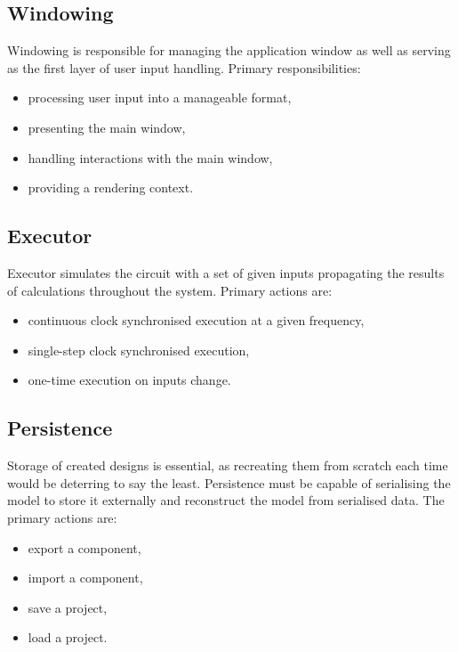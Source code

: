 \documentclass[12pt, a4paper]{article}
\newenvironment{itemlist}
{
  \vspace{-0.5\topsep}
  \begin{itemize}
    \setlength{\itemsep}{4pt}
    \setlength{\parskip}{0pt}
} {
  \end{itemize}
  \vspace{-0.5\topsep}
}
\begin{document}
\subsection{Windowing}
Windowing is responsible for managing the application window as well as serving
as the first layer of user input handling. Primary responsibilities:
\begin{itemlist}
  \item processing user input into a manageable format,
  \item presenting the main window,
  \item handling interactions with the main window,
  \item providing a rendering context.
\end{itemlist}

\subsection{Executor}
Executor simulates the circuit with a set of given inputs propagating the
results of calculations throughout the system. Primary actions are:
\begin{itemlist}
  \item continuous clock synchronised execution at a given frequency,
  \item single-step clock synchronised execution,
  \item one-time execution on inputs change.
\end{itemlist}

\subsection{Persistence}
Storage of created designs is essential, as recreating them from scratch each
time would be deterring to say the least. Persistence must be capable of
serialising the model to store it externally and reconstruct the model from
serialised data. The primary actions are:
\begin{itemlist}
  \item export a component,
  \item import a component,
  \item save a project,
  \item load a project.
\end{itemlist}
\end{document}
